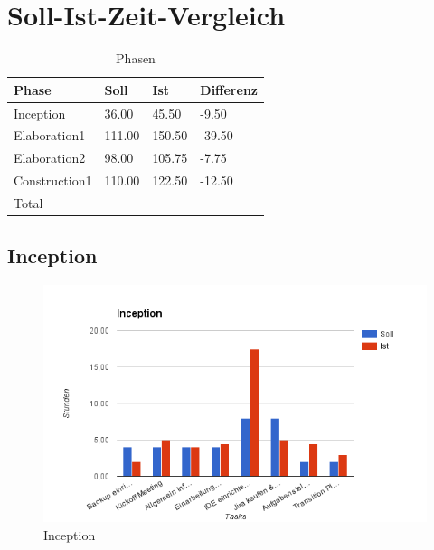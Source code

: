 \section{Soll-Ist-Zeit-Vergleich}

\begin{table}[H]
    \begin{tabular}{|p{5cm}|p{2cm}|p{2cm}|p{2cm}|}
    \hline    
    \rowcolor{lightblue}
	Phase & Soll & Ist & Differenz \\ \hline
	Inception & 36.00 &	45.50 &	-9.50 \\ \hline
	Elaboration1 & 111.00 & 150.50	& -39.50 \\ \hline
	Elaboration2 & 98.00 & 105.75 & -7.75 \\ \hline
	Construction1 & 110.00 & 122.50 & -12.50 \\ \hline
	\rowcolor{lightblue}
	Total & & & \\ \hline
    \end{tabular}
    \caption[Phasen]{Phasen}
\end{table}

\subsection{Inception}
\begin{figure}[H]
\includegraphics[width=\textwidth]{images/inception.png}
\caption[Inception]{Inception}
\end{figure}

